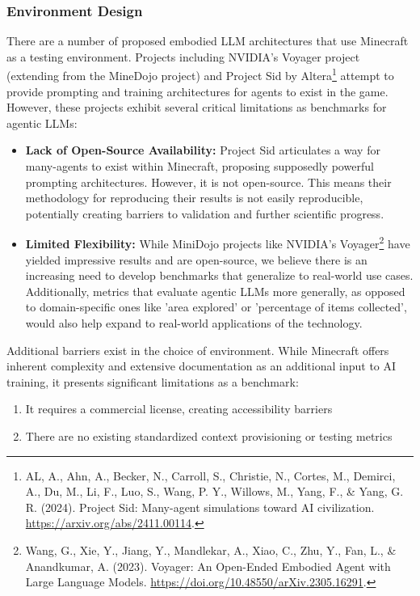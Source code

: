 \documentclass{article}
\begin{document}
\subsubsection{Environment Design}
There are a number of proposed embodied LLM architectures that use Minecraft as a testing environment.
Projects including NVIDIA's Voyager project (extending from the MineDojo project) and Project Sid by Altera\footnote{AL, A., Ahn, A., Becker, N., Carroll, S., Christie, N., Cortes, M., Demirci, A., Du, M., Li, F., Luo, S., Wang, P. Y., Willows, M., Yang, F., \& Yang, G. R. (2024). Project Sid: Many-agent simulations toward AI civilization. \url{https://arxiv.org/abs/2411.00114}.} attempt to provide prompting and training architectures for agents to exist in the game.
However, these projects exhibit several critical limitations as benchmarks for agentic LLMs:
\begin{itemize}[noitemsep,topsep=0pt]
    \item \textbf{Lack of Open-Source Availability:}
          Project Sid articulates a way for many-agents to exist within Minecraft, proposing supposedly powerful prompting architectures.
          However, it is not open-source.
          This means their methodology for reproducing their results is not easily reproducible, potentially creating barriers to validation and further scientific progress.
    \item \textbf{Limited Flexibility:}
          While MiniDojo projects like NVIDIA's Voyager\footnote{Wang, G., Xie, Y., Jiang, Y., Mandlekar, A., Xiao, C., Zhu, Y., Fan, L., \& Anandkumar, A. (2023). Voyager: An Open-Ended Embodied Agent with Large Language Models. \url{https://doi.org/10.48550/arXiv.2305.16291}.} have yielded impressive results and are open-source, we believe there is an increasing need to develop benchmarks that generalize to real-world use cases.
          Additionally, metrics that evaluate agentic LLMs more generally, as opposed to domain-specific ones like 'area explored' or 'percentage of items collected', would also help expand to real-world applications of the technology.
\end{itemize}

\vspace{-0.5em}
Additional barriers exist in the choice of environment.
While Minecraft offers inherent complexity and extensive documentation as an additional input to AI training, it presents significant limitations as a benchmark:
\begin{enumerate}[noitemsep]
    \item It requires a commercial license, creating accessibility barriers
    \item There are no existing standardized context provisioning or testing metrics
\end{enumerate}
\vspace{-0.45em}
\end{document}

